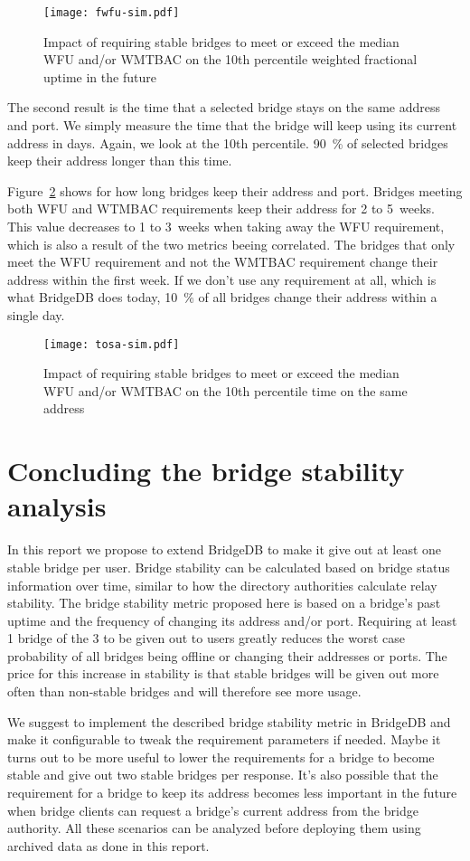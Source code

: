 \documentclass{article}
\begin{document}
\begin{figure}[t]
\texttt{[image: fwfu-sim.pdf]}
\caption{Impact of requiring stable bridges to meet or exceed the median
WFU and/or WMTBAC on the 10th percentile weighted fractional uptime in the
future}
\label{fig:fwfu-sim}
\end{figure}

The second result is the time that a selected bridge stays on the same
address and port.
We simply measure the time that the bridge will keep using its current
address in days.
Again, we look at the 10th percentile.
90~\% of selected bridges keep their address longer than this time.

Figure~\ref{fig:tosa-sim} shows for how long bridges keep their address
and port.
Bridges meeting both WFU and WTMBAC requirements keep their address for 2
to 5~weeks.
This value decreases to 1 to 3~weeks when taking away the WFU requirement,
which is also a result of the two metrics beeing correlated.
The bridges that only meet the WFU requirement and not the WMTBAC
requirement change their address within the first week.
If we don't use any requirement at all, which is what BridgeDB does today,
10~\% of all bridges change their address within a single day.

\begin{figure}[t]
\texttt{[image: tosa-sim.pdf]}
\caption{Impact of requiring stable bridges to meet or exceed the median
WFU and/or WMTBAC on the 10th percentile time on the same address}
\label{fig:tosa-sim}
\end{figure}

\section{Concluding the bridge stability analysis}

In this report we propose to extend BridgeDB to make it give out at least
one stable bridge per user.
Bridge stability can be calculated based on bridge status information over
time, similar to how the directory authorities calculate relay stability.
The bridge stability metric proposed here is based on a bridge's past
uptime and the frequency of changing its address and/or port.
Requiring at least 1 bridge of the 3 to be given out to users greatly
reduces the worst case probability of all bridges being offline or
changing their addresses or ports.
The price for this increase in stability is that stable bridges will be
given out more often than non-stable bridges and will therefore see more
usage.

We suggest to implement the described bridge stability metric in BridgeDB
and make it configurable to tweak the requirement parameters if needed.
Maybe it turns out to be more useful to lower the requirements for a
bridge to become stable and give out two stable bridges per response.
It's also possible that the requirement for a bridge to keep its address
becomes less important in the future when bridge clients can request a
bridge's current address from the bridge authority.
All these scenarios can be analyzed before deploying them using archived
data as done in this report.



\end{document}
